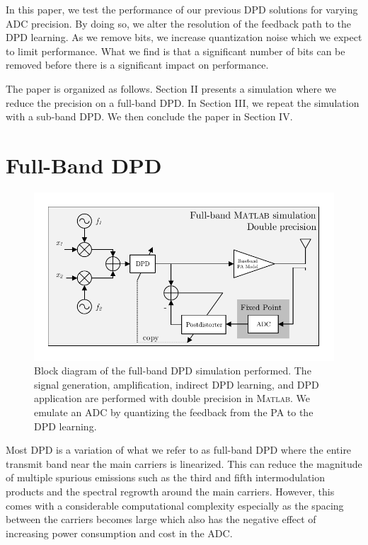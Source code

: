 \documentclass[conference]{IEEEtran}
\begin{document}
In this paper, we test the performance of our previous DPD solutions for varying ADC precision. 
By doing so, we alter the resolution of the feedback path to the DPD learning. 
As we remove bits, we increase quantization noise which we expect to limit performance. 
What we find is that a significant number of bits can be removed before there is a significant impact on performance.

The paper is organized as follows. 
Section II presents a simulation where we reduce the precision on a full-band DPD. 
In Section III, we repeat the simulation with a sub-band DPD. 
We then conclude the paper in Section IV.

\section{Full-Band DPD}

\begin{figure}[]
	\centering
	\includegraphics[width=\columnwidth]{FullBandIndirect}
	\caption{Block diagram of the full-band DPD simulation performed. The signal generation, amplification, indirect DPD learning, and DPD application are performed with double precision in \textsc{Matlab}. We emulate an ADC by quantizing the feedback from the PA to the DPD learning.}
	\label{block}
\end{figure}

Most DPD is a variation of what we refer to as full-band DPD where the entire transmit band near the main carriers is linearized. 
This can reduce the magnitude of multiple spurious emissions such as the third and fifth intermodulation products and the spectral regrowth around the main carriers. 
However, this comes with a considerable computational complexity especially as the spacing between the carriers becomes large \cite{TMTT_SubbandDPD} which also has the negative effect of increasing power consumption and cost in the ADC.
\end{document}
